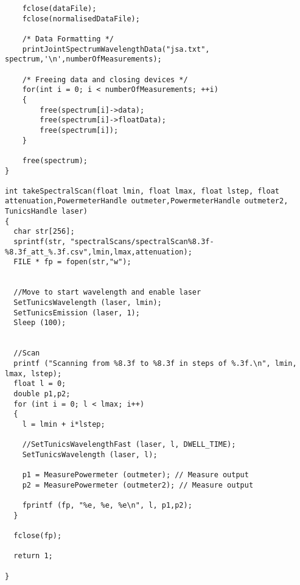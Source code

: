 \begin{lstlisting}
    fclose(dataFile);
    fclose(normalisedDataFile);

    /* Data Formatting */
    printJointSpectrumWavelengthData("jsa.txt", spectrum,'\n',numberOfMeasurements);

    /* Freeing data and closing devices */
    for(int i = 0; i < numberOfMeasurements; ++i)
    {
        free(spectrum[i]->data);
        free(spectrum[i]->floatData);
        free(spectrum[i]);
    }

    free(spectrum);
}

int takeSpectralScan(float lmin, float lmax, float lstep, float attenuation,PowermeterHandle outmeter,PowermeterHandle outmeter2, TunicsHandle laser)
{
  char str[256];
  sprintf(str, "spectralScans/spectralScan%8.3f-%8.3f_att_%.3f.csv",lmin,lmax,attenuation);
  FILE * fp = fopen(str,"w");


  //Move to start wavelength and enable laser
  SetTunicsWavelength (laser, lmin);
  SetTunicsEmission (laser, 1);
  Sleep (100);


  //Scan
  printf ("Scanning from %8.3f to %8.3f in steps of %.3f.\n", lmin, lmax, lstep);
  float l = 0;
  double p1,p2;
  for (int i = 0; l < lmax; i++)
  {
    l = lmin + i*lstep;

    //SetTunicsWavelengthFast (laser, l, DWELL_TIME);
    SetTunicsWavelength (laser, l);

    p1 = MeasurePowermeter (outmeter); // Measure output
    p2 = MeasurePowermeter (outmeter2); // Measure output

    fprintf (fp, "%e, %e, %e\n", l, p1,p2);
  }

  fclose(fp);

  return 1;

}
\end{lstlisting}